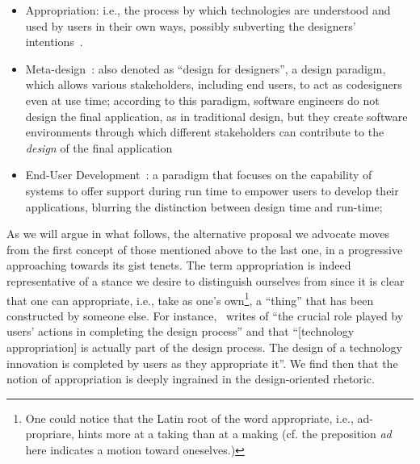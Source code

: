 \documentclass{article}
\begin{document}
\begin{itemize}
\item Appropriation: i.e., the process by which technologies are understood and used by users in their own ways, possibly subverting the designers' intentions~\citep{orlikowski_learning_1992,dix_designing_2007}.
\item Meta-design~\citep{fischer_meta-design:_2006}: also denoted as ``design for designers'', a design paradigm, which allows various stakeholders, including end users, to act as codesigners even at use time; according to this paradigm, software engineers do not design the final application, as in traditional design, but they create software environments through which different stakeholders can contribute to the \emph{design} of the final application
\item End-User Development~\citep{lieberman_end-user_2006}: a paradigm that focuses on the capability of systems to offer support during run time to
empower users to develop their applications, blurring the distinction between design time and run-time;
\end{itemize}

As we will argue in what follows, the alternative proposal we advocate moves from the first concept of those mentioned above to the last one, in a progressive approaching towards its gist tenets. The term appropriation is indeed representative of a stance we desire to distinguish ourselves from since it is clear that one can appropriate, i.e., take as one's own\footnote{One could notice that the Latin root of the word appropriate, i.e., ad-propriare, hints more at a taking than at a making (cf. the preposition \emph{ad} here indicates a motion toward oneselves.)}, a ``thing'' that has been constructed by someone else. For instance,~\citet{carroll_completing_2004} writes of ``the crucial role played by users' actions in completing the design process'' and that ``[technology appropriation] is actually part of the design process. The design of a technology innovation is completed by users as they appropriate it''. We find then that the notion of appropriation is deeply ingrained in the design-oriented rhetoric. 
\end{document}
